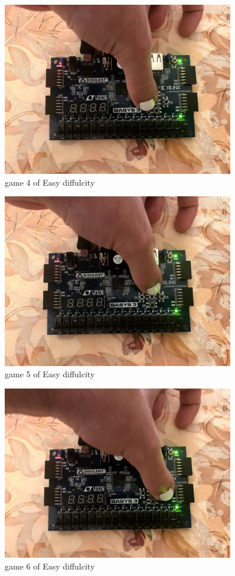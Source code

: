 \documentclass[11pt]{article}
\begin{document}
\begin{figure}
	\includegraphics[width=0.9\textwidth]{IMG_1314.jpg}
	\caption{game 4 of Easy diffulcity }
	\label{fig:sim_with_table}
\end{figure}
\begin{figure}
	\includegraphics[width=0.9\textwidth]{IMG_1315.jpg}
	\caption{game 5 of Easy diffulcity }
	\label{fig:sim_with_table}
\end{figure}
\begin{figure}
	\includegraphics[width=0.9\textwidth]{IMG_1316.jpg}
	\caption{game 6 of Easy diffulcity }
	\label{fig:sim_with_table}
\end{figure}
\end{document}
